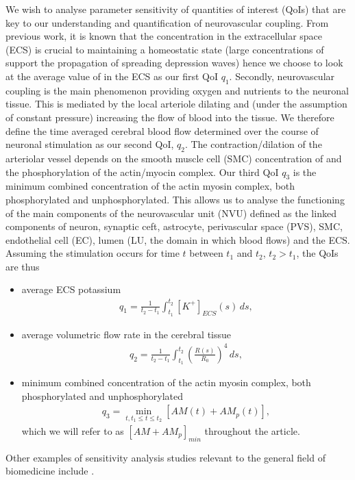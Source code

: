  We wish to analyse parameter sensitivity of quantities of interest (QoIs) that are key to our understanding and quantification of  neurovascular coupling.   From previous work, it is known that the \pot concentration in the extracellular space (ECS) is crucial to maintaining a homeostatic state (large concentrations of \pot support the propagation of spreading depression waves) hence we choose to look at the average value of \pot in the ECS as our first QoI $q_1$. Secondly, neurovascular coupling is the main phenomenon providing oxygen and nutrients to the neuronal tissue. This is mediated by the local arteriole dilating and (under the assumption of constant pressure) increasing the flow of blood into the tissue. We therefore define the time averaged cerebral blood flow determined over the course of neuronal stimulation as our second QoI, $q_2$. The contraction/dilation of the arteriolar vessel  depends on the smooth muscle cell (SMC) concentration of \ca and the phosphorylation of the actin/myocin complex. Our third QoI $q_3$ is the minimum combined concentration of the actin myosin complex, both phosphorylated and unphosphorylated. This allows us to analyse the functioning of the main components of the neurovascular unit (NVU) defined as the linked components of neuron, synaptic ceft, astrocyte, perivascular space (PVS), SMC, endothelial cell (EC), lumen (LU, the domain in which blood flows) and the ECS. 
  Assuming the stimulation occurs for time $t$ between $t_1$ and $t_2$, $t_2>t_1$,  the QoIs are thus
 \begin{itemize}
\item average ECS potassium 
\begin{eqnarray}
 q_1 = \frac{1}{t_2-t_1}\int_{t_1}^{t_2}[K^+]_{ECS}(s)\, ds, \label{K_ECS_Mean}
\end{eqnarray}
\item average volumetric flow rate in the cerebral tissue
\begin{eqnarray}
 q_2 = \frac{1}{t_2-t_1}\int_{t_1}^{t_2}\left(\frac{R(s)}{R_0}\right)^4\, ds, \label{vol_flow}
\end{eqnarray}
 \item minimum combined concentration of the actin myosin complex, both phosphorylated and unphosphorylated
\begin{eqnarray}
q_3 = \min _{t, t_1\le t \le t_2} [AM(t)+AM_p(t)], \label{AM_AMp_Min}
\end{eqnarray}
which we will refer to as $[AM+AM_p]_{min}$ throughout the article.
\end{itemize}

Other examples of sensitivity analysis studies relevant to the general field of biomedicine include \cite{gsa_pharm,lr_gsa,uqpy,Witthoft2013}.
